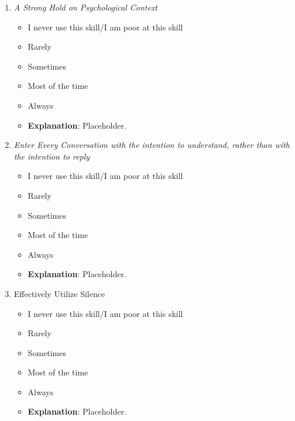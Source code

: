 \documentclass[stu,12pt]{apa7}
\begin{document}
      \begin{enumerate}
        \item \textit{A Strong Hold on Psychological Context}
          \begin{itemize}
            \item[\XSolidBrush] I never use this skill/I am poor at this skill
            \item[\XSolidBrush] Rarely
            \item[\XSolidBrush] Sometimes
            \item[\CheckmarkBold] Most of the time
            \item[\XSolidBrush] Always
          \end{itemize}
          \begin{itemize}
            \item \textbf{Explanation}: Placeholder.
          \end{itemize}
        \item \textit{%
          Enter Every Conversation with the intention to understand, rather %
            than with the intention to reply%
        }
          \begin{itemize}
            \item[\XSolidBrush] I never use this skill/I am poor at this skill
            \item[\CheckmarkBold] Rarely
            \item[\XSolidBrush] Sometimes
            \item[\XSolidBrush] Most of the time
            \item[\XSolidBrush] Always
          \end{itemize}
          \begin{itemize}
            \item \textbf{Explanation}: Placeholder.
          \end{itemize}
        \item Effectively Utilize Silence
          \begin{itemize}
            \item[\XSolidBrush] I never use this skill/I am poor at this skill
            \item[\XSolidBrush] Rarely
            \item[\CheckmarkBold] Sometimes
            \item[\XSolidBrush] Most of the time
            \item[\XSolidBrush] Always
          \end{itemize}
          \begin{itemize}
            \item \textbf{Explanation}: Placeholder.
          \end{itemize}
      \end{enumerate}
\end{document}
